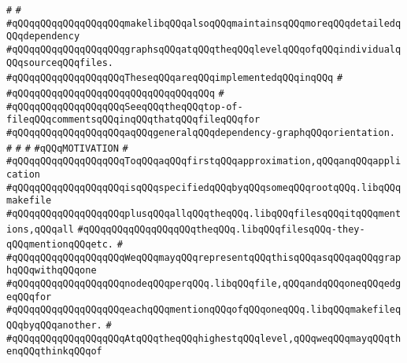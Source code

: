\verb|#|\newline
\verb|#|\newline
\verb|#qQQqqQQqqQQqqQQqqQQqmakelibqQQqalsoqQQqmaintainsqQQqmoreqQQqdetailedqQQqdependency|\newline
\verb|#qQQqqQQqqQQqqQQqqQQqgraphsqQQqatqQQqtheqQQqlevelqQQqofqQQqindividualqQQqsourceqQQqfiles.|\newline
\verb|#qQQqqQQqqQQqqQQqqQQqTheseqQQqareqQQqimplementedqQQqinqQQq|\newline
\verb|#|\newline
\verb|#qQQqqQQqqQQqqQQqqQQqqQQqqQQqqQQqqQQq|\newline
\verb|#|\newline
\verb|#qQQqqQQqqQQqqQQqqQQqSeeqQQqtheqQQqtop-of-fileqQQqcommentsqQQqinqQQqthatqQQqfileqQQqfor|\newline
\verb|#qQQqqQQqqQQqqQQqqQQqaqQQqgeneralqQQqdependency-graphqQQqorientation.|\newline
\verb|#|\newline
\verb|#|\newline
\verb|#|\newline
\verb|#qQQqMOTIVATION|\newline
\verb|#|\newline
\verb|#qQQqqQQqqQQqqQQqqQQqToqQQqaqQQqfirstqQQqapproximation,qQQqanqQQqapplication|\newline
\verb|#qQQqqQQqqQQqqQQqqQQqisqQQqspecifiedqQQqbyqQQqsomeqQQqrootqQQq.libqQQqmakefile|\newline
\verb|#qQQqqQQqqQQqqQQqqQQqplusqQQqallqQQqtheqQQq.libqQQqfilesqQQqitqQQqmentions,qQQqall|\newline
\verb|#qQQqqQQqqQQqqQQqqQQqtheqQQq.libqQQqfilesqQQq-they-qQQqmentionqQQqetc.|\newline
\verb|#|\newline
\verb|#qQQqqQQqqQQqqQQqqQQqWeqQQqmayqQQqrepresentqQQqthisqQQqasqQQqaqQQqgraphqQQqwithqQQqone|\newline
\verb|#qQQqqQQqqQQqqQQqqQQqnodeqQQqperqQQq.libqQQqfile,qQQqandqQQqoneqQQqedgeqQQqfor|\newline
\verb|#qQQqqQQqqQQqqQQqqQQqeachqQQqmentionqQQqofqQQqoneqQQq.libqQQqmakefileqQQqbyqQQqanother.|\newline
\verb|#|\newline
\verb|#qQQqqQQqqQQqqQQqqQQqAtqQQqtheqQQqhighestqQQqlevel,qQQqweqQQqmayqQQqthenqQQqthinkqQQqof|\newline
